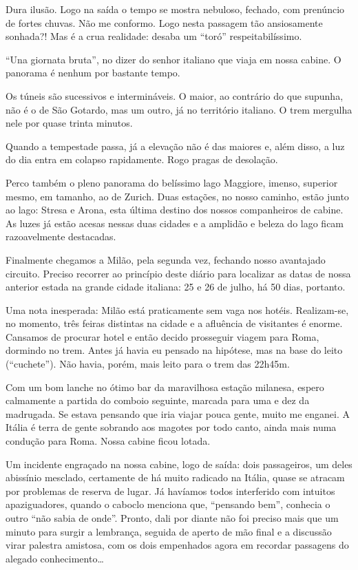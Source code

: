 Dura ilusão. Logo na saída o tempo se mostra nebuloso, fechado, com prenúncio de fortes chuvas. Não me conformo. Logo nesta passagem tão ansiosamente sonhada?! Mas é a crua realidade: desaba um ``toró'' respeitabilíssimo.

``Una giornata bruta'', no dizer do senhor italiano que viaja em nossa cabine. O panorama é nenhum por bastante tempo.

Os túneis são sucessivos e intermináveis. O maior, ao contrário do que supunha, não é o de São Gotardo, mas um outro, já no território italiano. O trem mergulha nele por quase trinta minutos.

Quando a tempestade passa, já a elevação não é das maiores e, além disso, a luz do dia entra em colapso rapidamente. Rogo pragas de desolação.

Perco também o pleno panorama do belíssimo lago Maggiore, imenso, superior mesmo, em tamanho, ao de Zurich. Duas estações, no nosso caminho, estão junto ao lago: Stresa e Arona, esta última destino dos nossos companheiros de cabine. As luzes já estão acesas nessas duas cidades e a amplidão e beleza do lago ficam razoavelmente destacadas.

Finalmente chegamos a Milão, pela segunda vez, fechando nosso avantajado circuito. Preciso recorrer ao princípio deste diário para localizar as datas de nossa anterior estada na grande cidade italiana: 25 e 26 de julho, há 50 dias, portanto.

Uma nota inesperada: Milão está praticamente sem vaga nos hotéis. Realizam-se, no momento, três feiras distintas na cidade e a afluência de visitantes é enorme. Cansamos de procurar hotel e então decido prosseguir viagem para Roma, dormindo no trem. Antes já havia eu pensado na hipótese, mas na base do leito (``cuchete''). Não havia, porém, mais leito para o trem das 22h45m.

Com um bom lanche no ótimo bar da maravilhosa estação milanesa, espero calmamente a partida do comboio seguinte, marcada para uma e dez da madrugada. Se estava pensando que iria viajar pouca gente, muito me enganei. A Itália é terra de gente sobrando aos magotes por todo canto, ainda mais numa condução para Roma. Nossa cabine ficou lotada.

Um incidente engraçado na nossa cabine, logo de saída: dois passageiros, um deles abissínio mesclado, certamente de há muito radicado na Itália, quase se atracam por problemas de reserva de lugar. Já havíamos todos interferido com intuitos apaziguadores, quando o caboclo menciona que, ``pensando bem'', conhecia o outro ``não sabia de onde''. Pronto, dali por diante não foi preciso mais que um minuto para surgir a lembrança, seguida de aperto de mão final e a discussão virar palestra amistosa, com os dois empenhados agora em recordar passagens do alegado conhecimento\ldots

